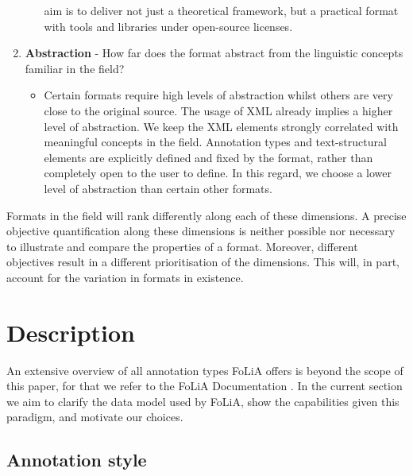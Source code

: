 \documentclass[a4paper,10pt,twoside]{article}
\begin{document}
\begin{enumerate}
\begin{itemize}
      aim is to deliver not just a theoretical framework, but a practical
      format with tools and libraries under open-source licenses.
  \end{itemize}
\item \textbf{Abstraction} - How far does the format abstract from the
  linguistic concepts familiar in the field?
  \begin{itemize}
    \item[] Certain formats require high levels of abstraction whilst others are
      very close to the original source. The usage of XML already implies a higher level of abstraction. We keep
      the XML elements strongly correlated with meaningful concepts in the
      field. Annotation types and text-structural elements are explicitly
      defined and fixed by the format, rather than completely open to the user
      to define. In this regard, we choose a lower level of abstraction than
      certain other formats. 
  \end{itemize}
\end{enumerate}

Formats in the field will rank differently along each of these dimensions. A
precise objective quantification along these dimensions is neither possible nor
necessary to illustrate and compare the properties of a format. Moreover,
different objectives result in a different prioritisation of the dimensions.
This will, in part, account for the variation in formats in existence.


\section{Description}
\label{sec:description}

An extensive overview of all annotation types FoLiA offers is beyond the scope of this
paper, for that we refer to the FoLiA Documentation \cite{FOLIA}. In the
current section we aim to clarify the data model used by FoLiA, show the
capabilities given this paradigm, and motivate our choices.

\subsection{Annotation style}
\end{document}
